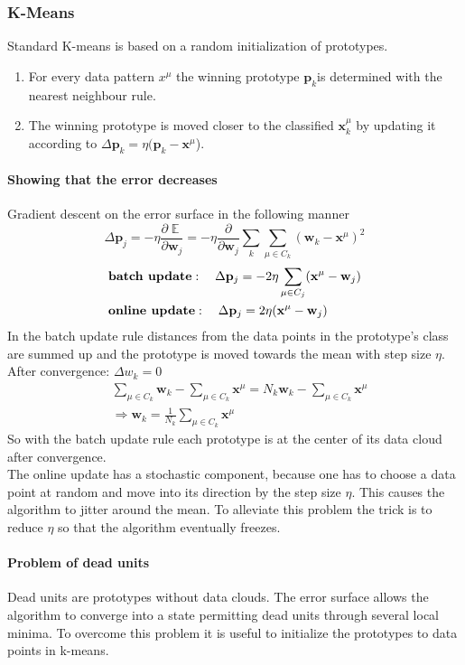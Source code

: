 \documentclass[11pt]{article}
\DeclareMathOperator{\E}{\mathbb{E}}
\begin{document}
\subsubsection{K-Means}
Standard K-means is based on a random initialization of prototypes. 
\begin{enumerate}
\item For every data pattern $x^\mu$ the winning prototype $\mathbf{p}_k$is determined with the nearest neighbour rule.
\item The winning prototype is moved closer to the classified $\mathbf{x}_k^\mu$ by updating it according to $\Delta \mathbf{p}_k = \eta (\mathbf{p}_k-\mathbf{x}^\mu$).
\end{enumerate}
\paragraph{Showing that the error decreases}
Gradient descent on the error surface in the following manner 
\[
\Delta \mathbf{p}_j = -\eta \frac{\partial\E}{\partial\mathbf{w}_j} = -\eta \frac{\partial}{\partial\mathbf{w}_j} \sum_k \sum_{\mu \in C_k} (\mathbf{w}_k-\mathbf{x}^\mu)^2
\]
\begin{align*}
&\text{\textbf{batch update}}: \quad\Delta \mathbf{p}_j
= -2\eta \sum_{\mu \in C_j}(\mathbf{x^\mu}-\mathbf{w}_j)\\
&\text{\textbf{online update}}: \quad\Delta \mathbf{p}_j
= 2\eta (\mathbf{x^\mu}-\mathbf{w}_j)
\end{align*}
In the batch update rule distances from the data points in the prototype's class are summed up and the prototype is moved towards the mean with step size $\eta$.\\
After convergence: $\Delta w_k=0$
\begin{align*}
&\sum_{\mu \in C_k}\mathbf{w}_k-\sum_{\mu \in C_k}\mathbf{x}^\mu=N_k\mathbf{w}_k-\sum_{\mu \in C_k}\mathbf{x}^\mu\\
&\Rightarrow \mathbf{w}_k=\frac{1}{N_k}\sum_{\mu \in C_k}\mathbf{x}^\mu
\end{align*}
So with the batch update rule each prototype is at the center of its data cloud after convergence.\\
The online update has a stochastic component, because one has to choose a data point at random and move into its direction by the step size $\eta$. This causes the algorithm to jitter around the mean. To alleviate this problem the trick is to reduce $\eta$ so that the algorithm eventually freezes.
\paragraph{Problem of dead units}
Dead units are prototypes without data clouds. The error surface allows the algorithm to converge into a state permitting dead units through several local minima. To overcome this problem it is useful to initialize the prototypes to data points in k-means.
\end{document}
